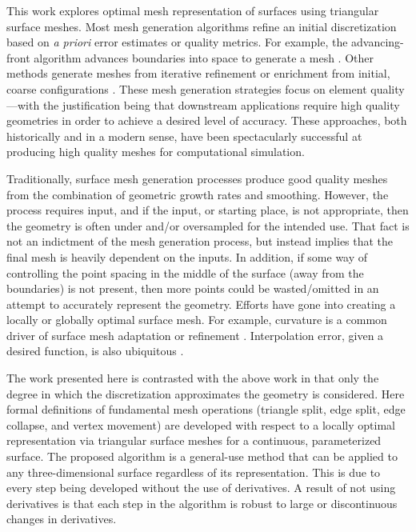 This work explores optimal mesh representation of surfaces using 
triangular surface meshes.
Most mesh generation algorithms refine an initial discretization based
on {\it a priori} error estimates or quality metrics. For example, the
advancing-front algorithm advances boundaries into space to generate a
mesh \cite{tristrano98,diaz-morcillo98}. Other methods generate
meshes from iterative refinement or enrichment from initial, coarse
configurations \cite{marcum98,marcum00,shewchuk02}. These mesh
generation strategies focus on element quality---with the
justification being that downstream applications require high quality
geometries in order to achieve a desired level of accuracy. These
approaches, both historically and in a modern sense, have been 
spectacularly successful at producing high quality meshes for 
computational simulation.

Traditionally, surface mesh generation processes produce good quality
meshes from the combination of geometric growth rates and smoothing.
However, the process requires input, and if the input, or starting place,
is not appropriate, then the geometry is often under and/or oversampled
for the intended use. That fact is not an indictment of the mesh
generation process, but instead implies that the final mesh is heavily
dependent on the inputs. In addition, if some way of controlling the
point spacing in the middle of the surface (away from the boundaries) is
not present, then more points could be wasted/omitted in an attempt to
accurately represent the geometry. Efforts have gone into
creating a locally or globally optimal surface mesh. For example,
curvature is a common driver of surface mesh adaptation or refinement
\cite{siqueria13}. Interpolation error, given a desired function, 
is also ubiquitous \cite{peraire87,alauzet06,buscaglia97,huang05}.

The work presented here is contrasted with the above work in that only
the degree in which the discretization approximates the geometry is
considered.  Here formal definitions of fundamental mesh operations
(triangle split, edge split, edge collapse, and vertex movement) are
developed with respect to a locally optimal representation via 
triangular surface meshes for a continuous, parameterized surface. The 
proposed algorithm is a general-use method
that can be applied to any three-dimensional surface regardless of its 
representation.
This is due to every step being developed without the use of
derivatives. A result of not using derivatives is that each step in the
algorithm is robust to large or discontinuous changes in derivatives.

